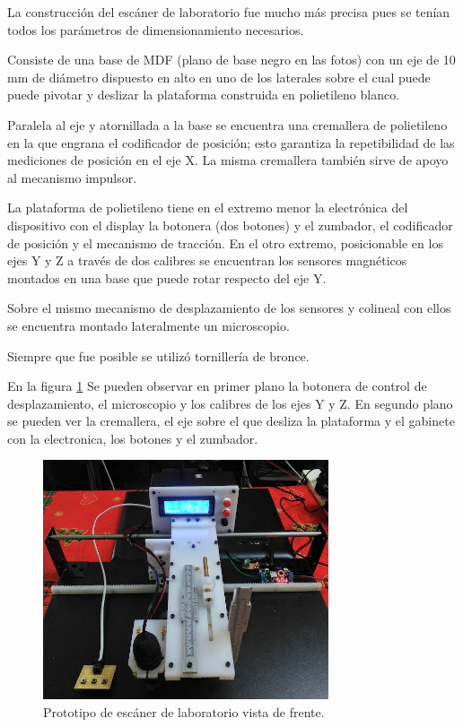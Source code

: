 La construcción del escáner de laboratorio fue mucho más precisa pues se tenían todos los parámetros de dimensionamiento necesarios. 

Consiste de una base de MDF (plano de base negro en las fotos) con un eje  de 10 mm de diámetro dispuesto en alto en uno de los laterales sobre el cual puede puede pivotar y deslizar la plataforma construida en polietileno blanco.

Paralela al eje y atornillada a la base se encuentra una cremallera de polietileno en la que engrana el codificador de posición; esto garantiza la repetibilidad de las mediciones de posición en el eje X. La misma cremallera también sirve de apoyo al mecanismo impulsor.

La plataforma de polietileno tiene en el extremo menor la electrónica del dispositivo con el display la botonera (dos botones) y el zumbador, el codificador de posición y el mecanismo de tracción. En el otro extremo, posicionable en los ejes Y y Z a través de dos calibres se encuentran los sensores magnéticos montados en una base que puede rotar respecto del eje Y. 

Sobre el mismo mecanismo de desplazamiento de los sensores y colineal con ellos se encuentra montado lateralmente un microscopio.

Siempre que fue posible se utilizó tornillería de bronce.

En la figura \ref{fig:escanerLaboratorio01} Se pueden observar en primer plano la botonera de control de desplazamiento, el microscopio y los calibres de los ejes Y y Z. En segundo plano se pueden ver la cremallera, el eje sobre el que desliza la plataforma y el gabinete con la electronica, los botones y el zumbador. 

\begin{figure}[H]
    \centering
    \includegraphics[width=0.75\textwidth]{./Figures/escanerLaboratorio01}
	\caption{Prototipo de escáner de laboratorio vista de frente.}
	\label{fig:escanerLaboratorio01}
 \end{figure}

